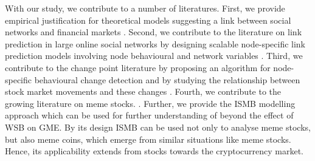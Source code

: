 With our study, we contribute to a number of literatures. First, we provide empirical justification for theoretical models suggesting a link between social networks and financial markets  \citep{Pedersen2022}. Second, we contribute to the literature on link prediction in large online social networks by designing scalable node-specific link prediction models involving node behavioural and network variables \citep{bhattacharya2019coevolution, Lu2013, han2020importance}. Third, we contribute to the change point literature by proposing an algorithm for node-specific behavioural change detection and by studying the relationship between stock market movements and these changes \citep{chen2024monitoring, bai2023multiple}. Fourth, we contribute to the growing literature on meme stocks. \citep{Li2024,Aloosh2021, Costola2021,Klein2022,Umar2021}. Further, we provide the ISMB modelling approach which can be used for further understanding of  beyond the effect of WSB on GME. By its design ISMB can be used not only to analyse meme stocks, but also meme coins, which emerge from similar situations like meme stocks. Hence, its applicability extends from stocks towards the cryptocurrency market. 


